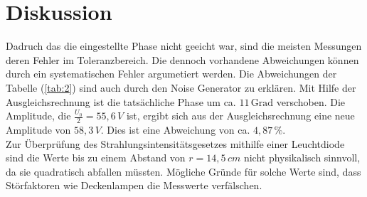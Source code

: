 \section{Diskussion}
Dadruch das die eingestellte Phase nicht geeicht war, sind die meisten Messungen deren Fehler
im Toleranzbereich. Die dennoch vorhandene Abweichungen können durch ein systematischen Fehler
argumetiert werden. Die Abweichungen der Tabelle (\ref{tab:2}) sind auch durch den Noise Generator
zu erklären.
Mit Hilfe der Ausgleichsrechnung ist die tatsächliche Phase um ca. $11 \, \text{Grad}$ verschoben.
Die Amplitude, die $\frac{U_0}{2} = 55,6 \, V$ ist, ergibt sich aus der Ausgleichsrechnung eine neue Amplitude von $58,3 \, V$.
Dies ist eine Abweichung von ca. $4,87 \, \%$. \\
Zur Überprüfung des Strahlungsintensitätsgesetzes mithilfe einer Leuchtdiode sind die Werte bis zu einem
Abstand von $r = 14,5 \, cm$ nicht physikalisch sinnvoll, da sie quadratisch abfallen müssten.
Mögliche Gründe für solche Werte sind, dass Störfaktoren wie Deckenlampen die
Messwerte verfälschen.
